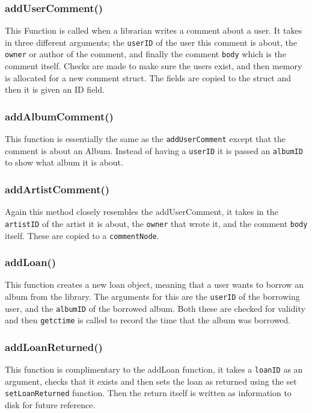 \documentclass{article}
\begin{document}
\subsubsection*{addUserComment()}
This Function is called when a librarian writes a comment about a user. It takes in three different arguments; the \verb|userID| of the user this comment is about, the \verb|owner| or author of the comment, and finally the comment \verb|body| which is the comment itself. Checks are made to make sure the users exist, and then memory is allocated for a new comment struct. The fields are copied to the struct and then it is given an ID field.

\subsubsection*{addAlbumComment()}
This function is essentially the same as the \verb|addUserComment| except that the comment is about an Album. Instead of having a \verb|userID| it is passed an \verb|albumID| to show what album it is about.

\subsubsection*{addArtistComment()}
Again this method closely resembles the addUserComment, it takes in the \verb|artistID| of the artist it is about, the \verb|owner| that wrote it, and the comment \verb|body| itself. These are copied to a \verb|commentNode|.

\subsubsection*{addLoan()}
This function creates a new loan object, meaning that a user wants to borrow an album from the library. The arguments for this are the \verb|userID| of the borrowing user, and the \verb|albumID| of the borrowed album. Both these are checked for validity and then \verb|getctime| is called to record the time that the album was borrowed.

\subsubsection*{addLoanReturned()}
This function is complimentary to the addLoan function, it takes a \verb|loanID| as an argument, checks that it exists and then sets the loan as returned using the set \verb|setLoanReturned| function. Then the return itself is written as information to disk for future reference.
\end{document}
